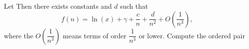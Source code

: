 Let   Then there exists constants   and $d$ such that \[f(n)=\ln(x)+\gamma+\dfrac{c}{n}+\dfrac{d}{n^2}+O\left(\dfrac{1}{n^3}\right),\] where the $O\left(\dfrac{1}{n^3}\right)$ means terms of order $\dfrac{1}{n^3}$ or lower.  Compute the ordered pair 